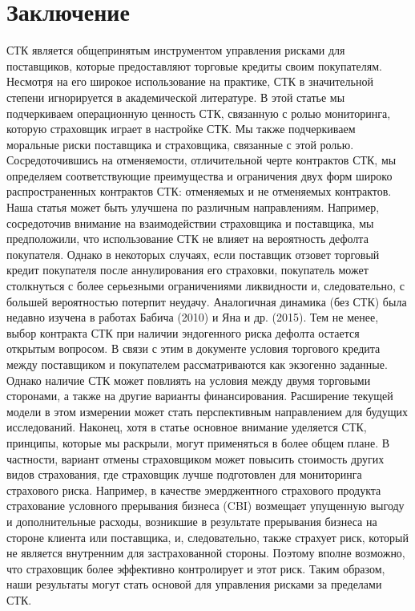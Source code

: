 \documentclass[a4paper,12pt]{article}
\begin{document}
\section{Заключение}
СТК является общепринятым инструментом управления рисками для поставщиков, которые предоставляют торговые кредиты своим покупателям. Несмотря на его широкое использование на практике, СТК в значительной степени игнорируется в академической литературе. В этой статье мы подчеркиваем операционную ценность СТК, связанную с ролью мониторинга, которую страховщик играет в настройке СТК. Мы также подчеркиваем моральные риски поставщика и страховщика, связанные с этой ролью. Сосредоточившись на отменяемости, отличительной черте контрактов СТК, мы определяем соответствующие преимущества и ограничения двух форм широко распространенных контрактов СТК: отменяемых и не отменяемых контрактов.
Наша статья может быть улучшена по различным направлениям. Например, сосредоточив внимание на взаимодействии страховщика и поставщика, мы предположили, что использование СТК не влияет на вероятность дефолта покупателя. Однако в некоторых случаях, если поставщик отзовет торговый кредит покупателя после аннулирования его страховки, покупатель может столкнуться с более серьезными ограничениями ликвидности и, следовательно, с большей вероятностью потерпит неудачу. Аналогичная динамика (без СТК) была недавно изучена в работах Бабича (2010) и Яна и др. (2015). Тем не менее, выбор контракта СТК при наличии эндогенного риска дефолта остается открытым вопросом. В связи с этим в документе условия торгового кредита между поставщиком и покупателем рассматриваются как экзогенно заданные. Однако наличие СТК может повлиять на условия между двумя торговыми сторонами, а также на другие варианты финансирования. Расширение текущей модели в этом измерении может стать перспективным направлением для будущих исследований. Наконец, хотя в статье основное внимание уделяется СТК, принципы, которые мы раскрыли, могут применяться в более общем плане. В частности, вариант отмены страховщиком может повысить стоимость других видов страхования, где страховщик лучше подготовлен для мониторинга страхового риска. Например, в качестве эмерджентного страхового продукта страхование условного прерывания бизнеса (CBI) возмещает упущенную выгоду и дополнительные расходы, возникшие в результате прерывания бизнеса на стороне клиента или поставщика, и, следовательно, также страхует риск, который не является внутренним для застрахованной стороны. Поэтому вполне возможно, что страховщик более эффективно контролирует и этот риск. Таким образом, наши результаты могут стать основой для управления рисками за пределами СТК.
\end{document}
